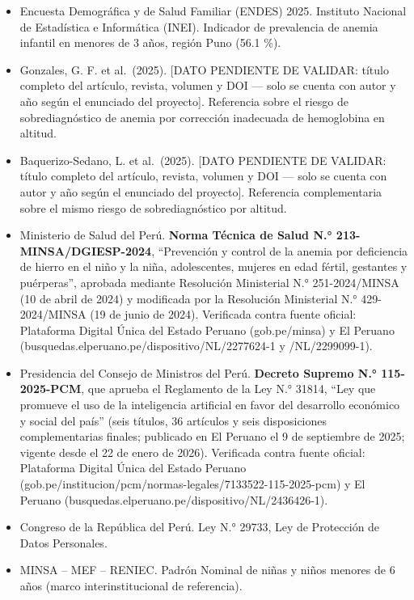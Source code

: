 \documentclass[11pt,a4paper]{article}
\providecommand{\tightlist}{%
  \setlength{\itemsep}{0pt}\setlength{\parskip}{0pt}}
\begin{document}
\begin{itemize}
\tightlist
\item
  Encuesta Demográfica y de Salud Familiar (ENDES) 2025. Instituto Nacional de Estadística e Informática (INEI). Indicador de prevalencia de anemia infantil en menores de 3 años, región Puno (56.1 \%).
\item
  Gonzales, G. F. et al.~(2025). {[}DATO PENDIENTE DE VALIDAR: título completo del artículo, revista, volumen y DOI --- solo se cuenta con autor y año según el enunciado del proyecto{]}. Referencia sobre el riesgo de sobrediagnóstico de anemia por corrección inadecuada de hemoglobina en altitud.
\item
  Baquerizo-Sedano, L. et al.~(2025). {[}DATO PENDIENTE DE VALIDAR: título completo del artículo, revista, volumen y DOI --- solo se cuenta con autor y año según el enunciado del proyecto{]}. Referencia complementaria sobre el mismo riesgo de sobrediagnóstico por altitud.
\item
  Ministerio de Salud del Perú. \textbf{Norma Técnica de Salud N.° 213-MINSA/DGIESP-2024}, ``Prevención y control de la anemia por deficiencia de hierro en el niño y la niña, adolescentes, mujeres en edad fértil, gestantes y puérperas'', aprobada mediante Resolución Ministerial N.° 251-2024/MINSA (10 de abril de 2024) y modificada por la Resolución Ministerial N.° 429-2024/MINSA (19 de junio de 2024). Verificada contra fuente oficial: Plataforma Digital Única del Estado Peruano (gob.pe/minsa) y El Peruano (busquedas.elperuano.pe/dispositivo/NL/2277624-1 y /NL/2299099-1).
\item
  Presidencia del Consejo de Ministros del Perú. \textbf{Decreto Supremo N.° 115-2025-PCM}, que aprueba el Reglamento de la Ley N.° 31814, ``Ley que promueve el uso de la inteligencia artificial en favor del desarrollo económico y social del país'' (seis títulos, 36 artículos y seis disposiciones complementarias finales; publicado en El Peruano el 9 de septiembre de 2025; vigente desde el 22 de enero de 2026). Verificada contra fuente oficial: Plataforma Digital Única del Estado Peruano (gob.pe/institucion/pcm/normas-legales/7133522-115-2025-pcm) y El Peruano (busquedas.elperuano.pe/dispositivo/NL/2436426-1).
\item
  Congreso de la República del Perú. Ley N.° 29733, Ley de Protección de Datos Personales.
\item
  MINSA -- MEF -- RENIEC. Padrón Nominal de niñas y niños menores de 6 años (marco interinstitucional de referencia).
\end{itemize}
\end{document}

